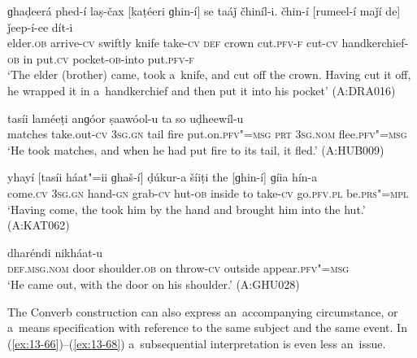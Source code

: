 \begin{exe}
\ex
\label{ex:13-62}
\gll ɡhaḍeerá phed-í laṣ-čax [kaṭéeri ɡhin-í] se taáǰ čhiníl-i. čhin-í [rumeel-í maǰí de] ǰeep-í-ee dít-i \\
elder.\textsc{ob} arrive-\textsc{cv} swiftly knife take-\textsc{cv} \textsc{def} crown cut.\textsc{pfv-f} cut-\textsc{cv} handkerchief-\textsc{ob} in put.\textsc{cv} pocket-\textsc{ob}-into put.\textsc{pfv-f} \\
\glt `The elder (brother) came, took a~knife, and cut off the crown. Having cut it off, he wrapped it in a~handkerchief and then put it into his pocket' (A:DRA016)

\ex
\label{ex:13-63}
 tasíi laméeṭi anɡóor ṣaawóol-u ta so uḍheewíl-u \\
matches take.out-\textsc{cv} \textsc{3sg.gn} tail fire put.on.\textsc{pfv"=msg}  \textsc{prt } \textsc{3sg.nom} flee.\textsc{pfv"=msg} \\
\glt `He took matches, and when he had put fire to its tail, it fled.' (A:HUB009)

\ex
\label{ex:13-64}
\gll yhayí [tasíi háat"=ii ɡhaš-í] ḍúkur-a šíiṭi the [ɡhin-í] ɡíia hín-a  \\
come.\textsc{cv} \textsc{3sg.gn} hand-\textsc{gn} grab-\textsc{cv} hut-\textsc{ob} inside to  take-\textsc{cv} go.\textsc{pfv.pl} be.\textsc{prs"=mpl} \\
\glt `Having come, the took him by the hand and brought him into the hut.' (A:KAT062)

\ex
\label{ex:13-65}
 dharéndi nikháat-u \\
\textsc{def.msg.nom} door shoulder.\textsc{ob} on throw-\textsc{cv} outside appear.\textsc{pfv"=msg} \\
\glt `He came out, with the door on his shoulder.' (A:GHU028) 
\end{exe}

 The Converb construction can also express an~accompanying circumstance, or a~means specification with reference to the same subject and the same event. In (\ref{ex:13-66})--(\ref{ex:13-68}) a~subsequential interpretation is even less an~issue.

